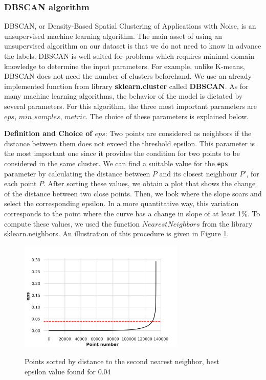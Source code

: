 \documentclass{siamart171218}
\begin{document}
\subsubsection{DBSCAN algorithm}

DBSCAN, or Density-Based Spatial Clustering of Applications with Noise, is an unsupervised machine learning algorithm. The main asset of using an unsupervised algorithm on our dataset is that we do not need to know in advance the labels. DBSCAN is well suited for problems which requires minimal domain knowledge to determine the input parameters. For example, unlike K-means, DBSCAN does not need the number of clusters beforehand.
We use an already implemented function from library \textbf{sklearn.cluster} called \textbf{DBSCAN}. As for many machine learning algorithms, the behavior of the model is dictated by several parameters. For this algorithm, the three most important parameters are $eps$, $min\_samples$, $metric$. The choice of these parameters is explained below. \newline

\textbf{Definition and Choice of $eps$}: Two points are considered as neighbors if the distance between them does not exceed the threshold epsilon. This parameter is the most important one since it provides the condition for two points to be considered in the same cluster. We can find a suitable value for the \texttt{eps} parameter by calculating the distance between $P$ and its closest neighbour $P'$, for each point $P$. After sorting these values, we obtain a plot that shows the change of the distance between two close points. Then, we look where the slope soars and select the corresponding epsilon. In a more quantitative way, this variation corresponds to the point where the curve has a change in slope of at least 1\%. To compute these values, we used the function $NearestNeighbors$ from the library sklearn.neighbors. An illustration of this procedure is given in Figure \ref{fig3}. \newline

\begin{figure}[h!]
\begin{center}
\includegraphics[width=0.7\textwidth]{epsilon.png}~\\[1cm]
\caption{Points sorted by distance to the second nearest neighbor, best epsilon value found for 0.04}
\label{fig3}
\end{center}
\end{figure}
\end{document}

